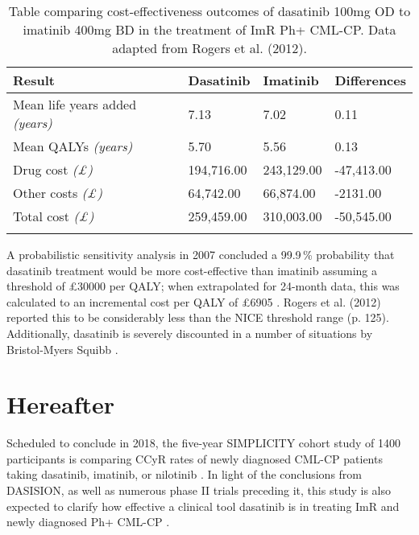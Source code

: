 \begin{table}
\centering
\caption{Table comparing cost-effectiveness outcomes of dasatinib 100mg OD to imatinib 400mg BD in the treatment of ImR Ph+ CML-CP. Data adapted from Rogers et al. (2012).}
\begin{tabu} to 0.475\textwidth {X[1.5]XXX[1.2]}
   \toprule
Result & Dasatinib  & Imatinib   & Differences \\
\midrule
Mean life years added \textit{{(}years{)}}& 7.13       & 7.02       & 0.11        \\
Mean QALYs \textit{{(}years{)}}            & 5.70       & 5.56       & 0.13        \\
Drug cost \textit{{(}\pounds{)}}                 & 194,716.00 & 243,129.00 & -47,413.00  \\
Other costs \textit{{(}\pounds{)}}    & 64,742.00  & 66,874.00  & -2131.00     \\
Total cost \textit{{(}\pounds{)}}                & 259,459.00 & 310,003.00 & -50,545.00 \\
   \bottomrule
\label{table:cost}
\end{tabu}
\end{table}

A probabilistic sensitivity analysis in 2007 concluded a 99.9\,\% probability that dasatinib treatment would be more cost-effective than imatinib assuming a threshold of \pounds 30000 per QALY; when extrapolated for 24-month data, this was calculated to an incremental cost per QALY of \pounds 6905 \citep{RefWorks:doc:58405bb8e4b0ccb837453b43}. Rogers et al. (2012) reported this to be \textquotesingle considerably less than the NICE threshold range\textquotesingle \hspace{0pt} (p. 125). Additionally, dasatinib is severely discounted in a number of situations by Bristol-Myers Squibb \citep{RefWorks:doc:585a3f40e4b02418eb47c841}.

\section{Hereafter}

Scheduled to conclude in 2018, the five-year SIMPLICITY cohort study of 1400 participants is comparing CCyR rates of newly diagnosed CML-CP patients taking dasatinib, imatinib, or nilotinib \citep{RefWorks:doc:58565c19e4b02dcd50f4ccad}. In light of the conclusions from DASISION, as well as numerous phase II trials preceding it, this study is also expected to clarify how effective a clinical tool dasatinib is in treating ImR and newly diagnosed Ph+ CML-CP \citep{RefWorks:doc:58403a89e4b088d36ea8c1b1,RefWorks:doc:58564bd8e4b0f87b6b283223}.

